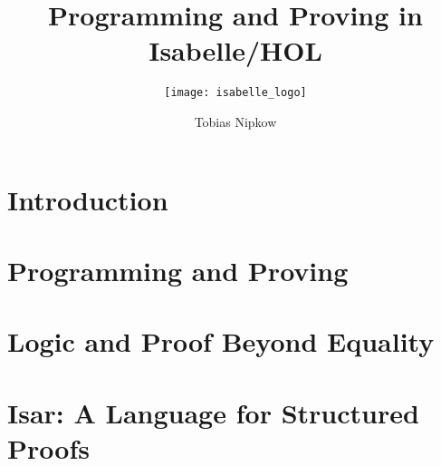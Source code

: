 \documentclass[envcountsame,envcountchap]{svmono}
\begin{document}
    \title{Programming and Proving in Isabelle/HOL}
    \subtitle{\texttt{[image: isabelle\_logo]}}
    \author{Tobias Nipkow}
    \maketitle

    \frontmatter%

    \setcounter{tocdepth}{1}
    \tableofcontents


    \mainmatter%



    \chapter{Introduction}
    


    \chapter{Programming and Proving}
    \label{sec:FP}
    
    
    

%


    \chapter{Logic and Proof Beyond Equality}
    \label{ch:Logic}
    


    \chapter{Isar: A Language for Structured Proofs}
    \label{ch:Isar}
    

    \backmatter%

    
    

\end{document}
